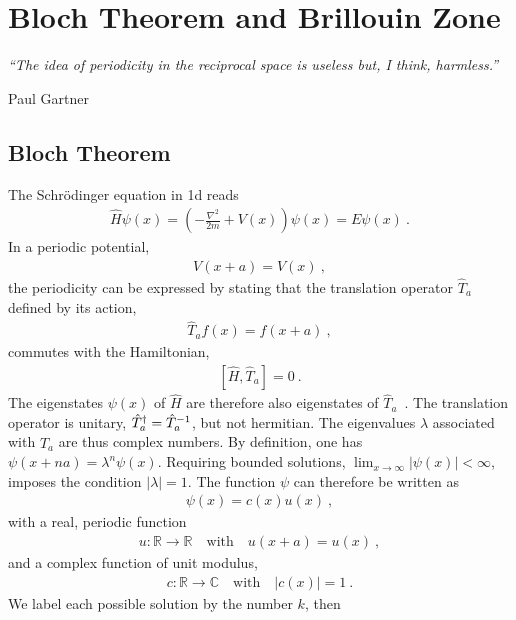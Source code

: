 \chapter{Bloch Theorem and Brillouin Zone}
\epigraph{\singlespacing \it ``The idea of periodicity in the reciprocal space is useless but, I think, harmless.''}{Paul Gartner}
\section{Bloch Theorem}
\label{sec:BlochTheorem}
The Schr\"odinger equation in 1d reads
\begin{align}
	\hat H \psi (x) = \left( - \frac{\nabla^2}{2m} + V(x) \right) \psi (x) = E \psi (x)~.
	\label{eq:app.bloch.se}
\end{align}
In a periodic potential,
\begin{align}
	V(x + a) = V(x)~,
	\label{eq:app.bloch.potential}
\end{align}
the periodicity can be expressed by stating that the translation operator $\hat T_a$ defined by its action,
\begin{align}
	\hat T_a f(x) = f(x + a)~,
	\label{eq:app.bloch.Ta}
\end{align}
commutes with the Hamiltonian,
\begin{align}
	\left[ \hat H , \hat T_a\right] = 0~.
	\label{eq:app.bloch.commute}
\end{align}
The eigenstates $\psi (x)$ of $\hat H$ are therefore also eigenstates of $\hat T_a$~\cite{Basdevant2000}. The translation operator is unitary, ${\hat T}^\dagger_a = \hat{T}_a^{-1}$, but not hermitian. The eigenvalues $\lambda$ associated with $\hat T_a$ are thus complex numbers. By definition, one has \mbox{$\psi ( x + na ) = \lambda^n \psi(x)$}. Requiring bounded solutions, $\lim_{x \rightarrow \infty} \lvert \psi (x) \rvert < \infty$, imposes the condition $\lvert \lambda \rvert = 1$.
The function $\psi$ can therefore be written as
\begin{align}
	\psi (x) = c(x) u(x)~,
\end{align}
with a real, periodic function
\begin{align}
	u: \mathds R \rightarrow \mathds R
	\quad\text{with}\quad u(x + a) = u(x)~,
\end{align}
and a complex function of unit modulus,
\begin{align}
	c: \mathds R \rightarrow \mathds C
	\quad\text{with}\quad \left\lvert c(x) \right\rvert = 1~.
	\label{eq:app.bloch.c1}
\end{align}
We label each possible solution by the number $k$, then
